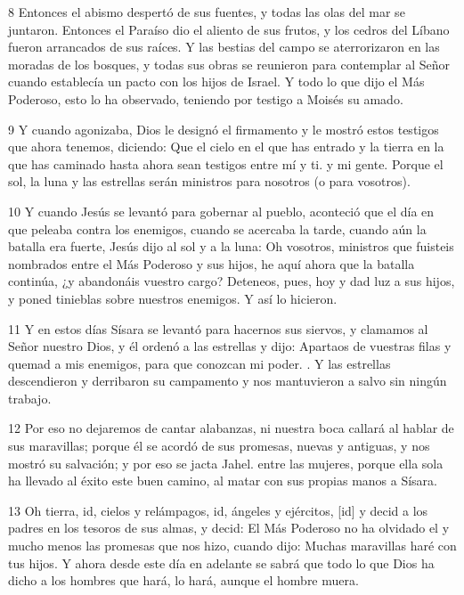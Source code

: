 \par 8 Entonces el abismo despertó de sus fuentes, y todas las olas del mar se juntaron. Entonces el Paraíso dio el aliento de sus frutos, y los cedros del Líbano fueron arrancados de sus raíces. Y las bestias del campo se aterrorizaron en las moradas de los bosques, y todas sus obras se reunieron para contemplar al Señor cuando establecía un pacto con los hijos de Israel. Y todo lo que dijo el Más Poderoso, esto lo ha observado, teniendo por testigo a Moisés su amado.

\par 9 Y cuando agonizaba, Dios le designó el firmamento y le mostró estos testigos que ahora tenemos, diciendo: Que el cielo en el que has entrado y la tierra en la que has caminado hasta ahora sean testigos entre mí y ti. y mi gente. Porque el sol, la luna y las estrellas serán ministros para nosotros (o para vosotros).

\par 10 Y cuando Jesús se levantó para gobernar al pueblo, aconteció que el día en que peleaba contra los enemigos, cuando se acercaba la tarde, cuando aún la batalla era fuerte, Jesús dijo al sol y a la luna: Oh vosotros, ministros que fuisteis nombrados entre el Más Poderoso y sus hijos, he aquí ahora que la batalla continúa, ¿y abandonáis vuestro cargo? Deteneos, pues, hoy y dad luz a sus hijos, y poned tinieblas sobre nuestros enemigos. Y así lo hicieron.

\par 11 Y en estos días Sísara se levantó para hacernos sus siervos, y clamamos al Señor nuestro Dios, y él ordenó a las estrellas y dijo: Apartaos de vuestras filas y quemad a mis enemigos, para que conozcan mi poder. . Y las estrellas descendieron y derribaron su campamento y nos mantuvieron a salvo sin ningún trabajo.

\par 12 Por eso no dejaremos de cantar alabanzas, ni nuestra boca callará al hablar de sus maravillas; porque él se acordó de sus promesas, nuevas y antiguas, y nos mostró su salvación; y por eso se jacta Jahel. entre las mujeres, porque ella sola ha llevado al éxito este buen camino, al matar con sus propias manos a Sísara.

\par 13 Oh tierra, id, cielos y relámpagos, id, ángeles y ejércitos, [id] y decid a los padres en los tesoros de sus almas, y decid: El Más Poderoso no ha olvidado el y mucho menos las promesas que nos hizo, cuando dijo: Muchas maravillas haré con tus hijos. Y ahora desde este día en adelante se sabrá que todo lo que Dios ha dicho a los hombres que hará, lo hará, aunque el hombre muera.

